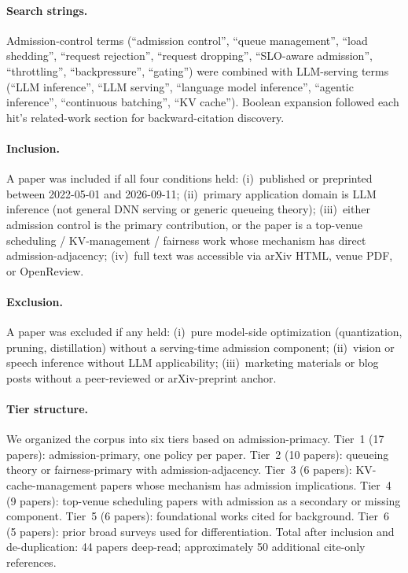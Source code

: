 \documentclass[10pt]{article} %
\theoremstyle{definition}
\begin{document}
\paragraph{Search strings.} Admission-control terms (``admission
control'', ``queue management'', ``load shedding'', ``request
rejection'', ``request dropping'', ``SLO-aware admission'',
``throttling'', ``backpressure'', ``gating'') were combined with
LLM-serving terms (``LLM inference'', ``LLM serving'', ``language
model inference'', ``agentic inference'', ``continuous batching'',
``KV cache''). Boolean expansion followed each hit's related-work
section for backward-citation discovery.

\paragraph{Inclusion.} A paper was included if all four conditions
held: (i)~published or preprinted between 2022-05-01 and 2026-09-11;
(ii)~primary application domain is LLM inference (not general DNN
serving or generic queueing theory); (iii)~either admission control is
the primary contribution, or the paper is a top-venue scheduling /
KV-management / fairness work whose mechanism has direct
admission-adjacency; (iv)~full text was accessible via arXiv HTML,
venue PDF, or OpenReview.

\paragraph{Exclusion.} A paper was excluded if any held: (i)~pure
model-side optimization (quantization, pruning, distillation) without
a serving-time admission component; (ii)~vision or speech inference
without LLM applicability; (iii)~marketing materials or blog posts
without a peer-reviewed or arXiv-preprint anchor.

\paragraph{Tier structure.} We organized the corpus into six tiers
based on admission-primacy. Tier~1 (17 papers): admission-primary,
one policy per paper. Tier~2 (10 papers): queueing theory or
fairness-primary with admission-adjacency. Tier~3 (6 papers):
KV-cache-management papers whose mechanism has admission
implications. Tier~4 (9 papers): top-venue scheduling papers with
admission as a secondary or missing component. Tier~5 (6 papers):
foundational works cited for background. Tier~6 (5 papers): prior
broad surveys used for differentiation. Total after inclusion and
de-duplication: 44 papers deep-read; approximately 50 additional
cite-only references.
\end{document}
